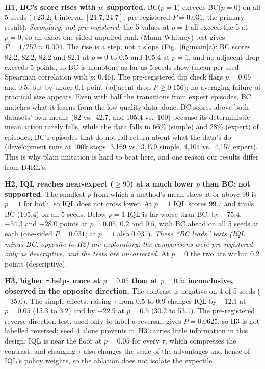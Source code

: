 \documentclass{article}
\begin{document}
\textbf{H1, BC's score rises with $p$: supported.} BC($p{=}1$) exceeds BC($p{=}0$) on all 5 seeds ($+23.2$; t-interval $[21.7, 24.7]$; pre-registered $P=0.031$, the primary result). \emph{Secondary, not pre-registered:} the 5 values at $p=1$ all exceed the 5 at $p=0$, so an exact one-sided unpaired rank (Mann-Whitney) test gives $P=1/252\approx0.004$. The rise is a step, not a slope (Fig.~\ref{fig:main}a): BC scores 82.2, 82.2, 82.2 and 82.1 at $p=0$ to $0.5$ and 105.4 at $p=1$, and no adjacent drop exceeds 5 points, so BC is monotone as far as 5 seeds show (mean per-seed Spearman correlation with $p$: 0.46). The pre-registered dip check flags $p=0.05$ and $0.5$, but by under 0.1 point (adjacent-drop $P\geq0.156$): no averaging failure of practical size appears. Even with half the transitions from expert episodes, BC matches what it learns from the low-quality data alone. BC scores above both datasets' own means (82 vs.\ 42.7, and 105.4 vs.\ 100) because its deterministic mean action rarely falls, while the data falls in 66\% (simple) and 28\% (expert) of episodes; BC's episodes that do not fall return about what the data's do (development runs at 100k steps: 3,169 vs.\ 3,179 simple, 4,104 vs.\ 4,157 expert). This is why plain imitation is hard to beat here, and one reason our results differ from D4RL's.

\textbf{H2, IQL reaches near-expert ($\geq 90$) at a much lower $p$ than BC: not supported.} The smallest $p$ from which a method's mean stays at or above 90 is $p=1$ for both, so IQL does not cross lower. At $p=1$ IQL scores 99.7 and trails BC (105.4) on all 5 seeds. Below $p=1$ IQL is far worse than BC: by $-75.4$, $-54.3$ and $-28.0$ points at $p=0.05$, $0.2$ and $0.5$, with BC ahead on all 5 seeds at each (one-sided $P=0.031$; at $p=1$ also 0.031). \emph{These ``BC leads'' tests (IQL minus BC, opposite to H2) are exploratory: the comparisons were pre-registered only as descriptive, and the tests are uncorrected.} At $p=0$ the two are within 0.2 points (descriptive).

\textbf{H3, higher $\tau$ helps more at $p=0.05$ than at $p=0.5$: inconclusive, observed in the opposite direction.} The contrast is negative on 4 of 5 seeds ($-35.0$). The simple effects: raising $\tau$ from 0.5 to 0.9 changes IQL by $-12.1$ at $p=0.05$ (15.3 to 3.2) and by $+22.9$ at $p=0.5$ (30.2 to 53.1). The pre-registered reverse-direction test, used only to label a reversal, gives $P=0.0625$, so H3 is not labelled reversed: seed 4 alone prevents it. H3 carries little information in this design: IQL is near the floor at $p=0.05$ for every $\tau$, which compresses the contrast, and changing $\tau$ also changes the scale of the advantages and hence of IQL's policy weights, so the ablation does not isolate the expectile.
\end{document}
